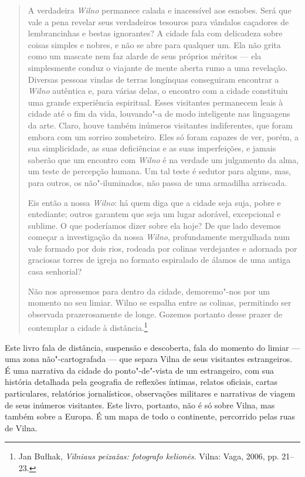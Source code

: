\begin{quote}
A verdadeira \textit{Wilno} permanece calada e inacessível aos esnobes. Será que
vale a pena revelar seus verdadeiros tesouros para vândalos caçadores de
lembrancinhas e bestas ignorantes? A cidade fala com delicadeza sobre
coisas simples e nobres, e não se abre para qualquer um. Ela não grita
como um mascate nem faz alarde de seus próprios méritos --- ela
simplesmente conduz o viajante de mente aberta rumo a uma revelação.
Diversas pessoas vindas de terras longínquas conseguiram encontrar a
\textit{Wilno} autêntica e, para várias delas, o encontro com a cidade constituiu
uma grande experiência espiritual. Esses visitantes permanecem leais à
cidade até o fim da vida, louvando"-a de modo inteligente nas linguagens
da arte. Claro, houve também inúmeros visitantes indiferentes, que foram
embora com um sorriso zombeteiro. Eles só foram capazes de ver, porém, a
sua simplicidade, as suas deficiências e as suas imperfeições, e jamais
saberão que um encontro com \textit{Wilno} é na verdade um julgamento da alma, um
teste de percepção humana. Um tal teste é sedutor para alguns, mas, para
outros, os não"-iluminados, não passa de uma armadilha arriscada.

Eis então a nossa \textit{Wilno}: há quem diga que a cidade seja suja, pobre e
entediante; outros garantem que seja um lugar adorável, excepcional e
sublime. O que poderíamos dizer sobre ela hoje? De que lado devemos
começar a investigação da nossa \textit{Wilno}, profundamente mergulhada num vale
formado por dois rios, rodeada por colinas verdejantes e adornada por
graciosas torres de igreja no formato espiralado de álamos de uma antiga
casa senhorial?

Não nos apressemos para dentro da cidade, demoremo"-nos por um momento no
seu limiar. Wilno se espalha entre as colinas, permitindo ser observada
prazerosamente de longe. Gozemos portanto desse prazer de contemplar a
cidade à distância.\footnote{Jan Bułhak, \textit{Vilniaus peizažas: fotografo kelionės}. Vilna: Vaga, 2006, pp. 21--23.}
\end{quote}

\asterisc

Este livro fala de distância, suspensão e descoberta, fala do momento do
limiar --- uma zona não"-cartografada --- que separa Vilna de seus visitantes
estrangeiros. É uma narrativa da cidade do ponto"-de"-vista de um
estrangeiro, com sua história detalhada pela geografia de reflexões
íntimas, relatos oficiais, cartas particulares, relatórios
jornalísticos, observações militares e narrativas de viagem de seus
inúmeros visitantes. Este livro, portanto, não é só sobre Vilna, mas
também sobre a Europa. É um mapa de todo o continente, percorrido pelas
ruas de Vilna.

